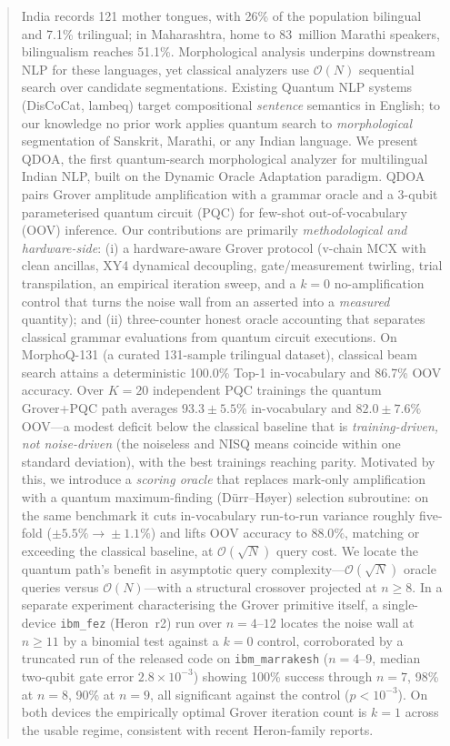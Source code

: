 \documentclass[journal]{IEEEtran}
\newcommand{\bigO}{\mathcal{O}}
\newcommand{\sqrtN}{\sqrt{N}}
\begin{document}
\begin{abstract}
India records 121 mother tongues, with 26\% of the population bilingual and
7.1\% trilingual; in Maharashtra, home to 83~million Marathi speakers,
bilingualism reaches 51.1\%. Morphological analysis underpins downstream NLP
for these languages, yet classical analyzers use $\bigO(N)$ sequential search
over candidate segmentations. Existing Quantum NLP systems (DisCoCat, lambeq)
target compositional \emph{sentence} semantics in English; to our knowledge no
prior work applies quantum search to \emph{morphological} segmentation of
Sanskrit, Marathi, or any Indian language. We present QDOA, the first
quantum-search morphological analyzer for multilingual Indian NLP, built on the
Dynamic Oracle Adaptation paradigm. QDOA pairs Grover amplitude amplification
with a grammar oracle and a 3-qubit parameterised quantum circuit (PQC) for
few-shot out-of-vocabulary (OOV) inference. Our contributions are primarily
\emph{methodological and hardware-side}: (i) a hardware-aware Grover protocol
(v-chain MCX with clean ancillas, XY4 dynamical decoupling, gate/measurement
twirling, trial transpilation, an empirical iteration sweep, and a $k{=}0$
no-amplification control that turns the noise wall from an asserted into a
\emph{measured} quantity); and (ii) three-counter honest oracle accounting that
separates classical grammar evaluations from quantum circuit executions.
On MorphoQ-131 (a curated 131-sample trilingual dataset), classical beam search
attains a deterministic 100.0\% Top-1 in-vocabulary and 86.7\% OOV accuracy. Over
$K{=}20$ independent PQC trainings the quantum Grover+PQC path averages
$93.3\pm5.5\%$ in-vocabulary and $82.0\pm7.6\%$ OOV---a modest deficit below the
classical baseline that is \emph{training-driven, not noise-driven} (the noiseless
and NISQ means coincide within one standard deviation), with the best trainings
reaching parity. Motivated by this, we introduce a \emph{scoring oracle} that
replaces mark-only amplification with a quantum maximum-finding (D\"urr--H\o yer)
selection subroutine: on the same benchmark it cuts in-vocabulary run-to-run
variance roughly five-fold ($\pm5.5\%\!\to\!\pm1.1\%$) and lifts OOV accuracy to
$88.0\%$, matching or exceeding the classical baseline, at $\bigO(\sqrtN)$ query
cost. We locate the quantum path's benefit in asymptotic query
complexity---$\bigO(\sqrtN)$ oracle queries versus $\bigO(N)$---with a structural
crossover projected at $n\!\ge\!8$. In a separate experiment characterising the
Grover primitive itself, a single-device \texttt{ibm\_fez} (Heron~r2) run over
$n{=}4$--$12$ locates the noise wall at $n\!\ge\!11$ by a binomial test against a
$k{=}0$ control, corroborated by a truncated run of the released code on
\texttt{ibm\_marrakesh} ($n{=}4$--$9$, median two-qubit gate error
$2.8\times10^{-3}$) showing 100\% success through $n{=}7$, 98\% at $n{=}8$, 90\%
at $n{=}9$, all significant against the control ($p<10^{-3}$). On both devices the
empirically optimal Grover iteration count is $k{=}1$ across the usable regime,
consistent with recent Heron-family reports.
\end{abstract}
\end{document}
